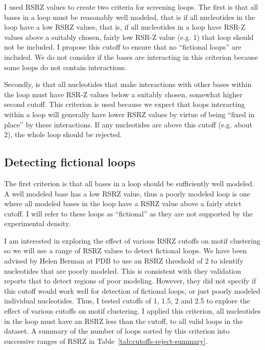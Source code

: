 I used RSRZ values to create two criteria for screening loops. The first is that
all bases in a loop must be reasonably well modeled, that is if all nucleotides
in the loop have a low RSRZ values, that is, if all nucleotides in a loop have
RSR-Z values above a suitably chosen, fairly low RSR-Z value (e.g. 1) that loop
should not be included. I propose this cutoff to ensure that no ``fictional
loops'' are included. We do not consider if the bases are interacting in this
criterion because some loops do not contain interactions. 

Secondly, is that all nucleotides that make interactions with other bases within
the loop must have RSR-Z values below a suitably chosen, somewhat higher second
cutoff. This criterion is used because we expect that loops interacting within a
loop will generally have lower RSRZ values by virtue of being ``fixed in place''
by these interactions. If any nucleotides are above this cutoff (e.g. about 2),
the whole loop should be rejected.

\subsection{Detecting fictional loops}

The first criterion is that all bases in a loop should be sufficiently well
modeled. A well modeled base has a low RSRZ value, thus a poorly modeled loop is
one where all modeled bases in the loop have a RSRZ value above a fairly strict
cutoff. I will refer to these loops as ``fictional'' as they are not supported
by the experimental density. 

I am interested in exploring the effect of various RSRZ cutoffs on motif
clustering so we will use a range of RSRZ values to detect fictional loops. We
have been advised by Helen Berman at PDB to use an RSRZ threshold of 2 to
identify nucleotides that are poorly modeled. This is consistent with they
validation reports that to detect regions of poor modeling. However, they did
not specify if this cutoff would work well for detection of fictional loops, or
just poorly modeled individual nucleotides. Thus, I tested cutoffs of 1, 1.5, 2 and
2.5 to explore the effect of various cutoffs on motif clustering. I applied this
criterion, all nucleotides in the loop must have an RSRZ less than the cutoff,
to all valid loops in the dataset. A summary of the number of loops sorted by
this criterion into successive ranges of RSRZ in
Table~\ref{tab:cutoffs-reject-summary}.

